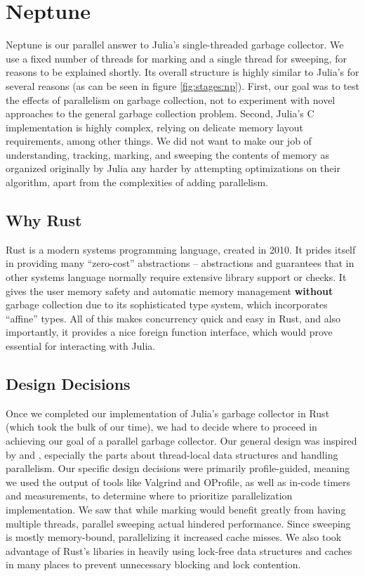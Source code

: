 \section{Neptune} \label{neptune}

Neptune is our parallel answer to Julia's single-threaded garbage collector.
We use a fixed number of threads for marking and a single thread for sweeping, for reasons to be explained shortly. 
Its overall structure is highly similar to Julia's for several reasons (as can be seen in figure \ref{fig:stages:np}).
First, our goal was to test the effects of parallelism on garbage collection, not to experiment with novel approaches to the general garbage collection problem.
Second, Julia's C implementation is highly complex, relying on delicate memory layout requirements, among other things.
We did not want to make our job of understanding, tracking, marking, and sweeping the contents of memory as organized originally by Julia any harder by attempting optimizations on their algorithm, apart from the complexities of adding parallelism.

\subsection{Why Rust}
Rust is a modern systems programming language, created in 2010.
It prides itself in providing many ``zero-cost'' abstractions -- abstractions and guarantees that in other systems language normally require extensive library support or checks.
It gives the user memory safety and automatic memory management \textbf{without} garbage collection due to its sophisticated type system, which incorporates ``affine'' types.
All of this makes concurrency quick and easy in Rust, and also importantly, it provides a nice foreign function interface, which would prove essential for interacting with Julia.

\subsection{Design Decisions}
Once we completed our implementation of Julia's garbage collector in Rust (which took the bulk of our time), we had to decide where to proceed in achieving our goal of a parallel garbage collector.
Our general design was inspired by \cite{marlow2008parallel} and \cite{marlow2011multicore}, especially the parts about thread-local data structures and handling parallelism.
Our specific design decisions were primarily profile-guided, meaning we used the output of tools like Valgrind and OProfile, as well as in-code timers and measurements, to determine where to prioritize parallelization implementation.
We saw that while marking would benefit greatly from having multiple threads, parallel sweeping actual hindered performance.
Since sweeping is mostly memory-bound, parallelizing it increased cache misses.
We also took advantage of Rust's libaries in heavily using lock-free data structures and caches in many places to prevent unnecessary blocking and lock contention.

